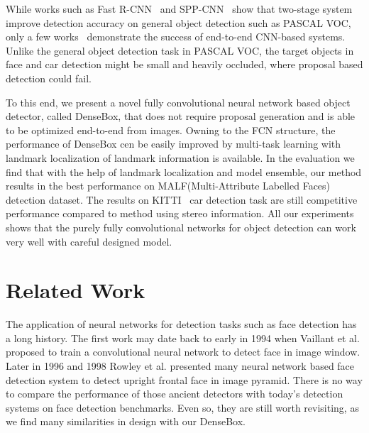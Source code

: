 While works such as Fast R-CNN~\cite{girshirck2015fast} and SPP-CNN~\cite{} show that two-stage system improve detection accuracy on general object detection such as PASCAL VOC, only a few works~\cite{farfade2015multi} demonstrate the success of end-to-end CNN-based systems. Unlike the general object detection task in PASCAL VOC, the target objects in face and car detection might be small and heavily occluded, where proposal based detection could fail. 

To this end, we present a novel fully convolutional neural network based object detector, called DenseBox, that does not require proposal generation and is able to be optimized end-to-end from images.  Owning to the FCN structure,  the performance of DenseBox cen be easily improved by multi-task learning with landmark localization of landmark information is available.  In the evaluation we find that with the help of landmark localization and model ensemble, our method results in the best performance on MALF(Multi-Attribute Labelled Faces)~\cite{faceevaluation15} detection dataset. The results on KITTI~\cite{Geiger2012CVPR} car detection task are still competitive performance compared to method using stereo information. All our experiments shows that the purely fully convolutional networks for object detection can work very well with careful designed model. 

\section{Related Work}

 


The application of neural networks for detection tasks such as face detection has a long history. The first work may date back to early in 1994 when Vaillant et al.\cite{vaillant1994original} proposed to train a convolutional neural network to detect face in image window.  Later in 1996 and 1998 Rowley et al.\cite{rowley1998neural,rowley1998rotation} presented many neural network based face detection system to detect upright frontal face in image pyramid. There is no way to compare the performance of those ancient detectors with today’s detection systems on face detection benchmarks. Even so, they are still worth revisiting, as we find many similarities in design with our DenseBox. 

